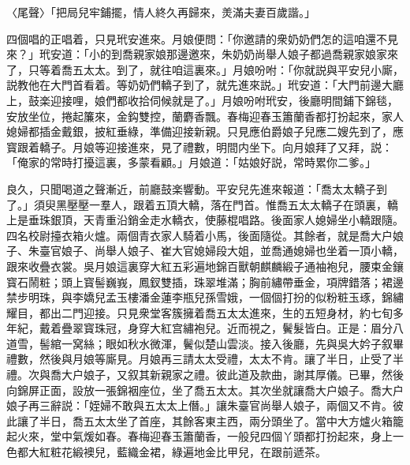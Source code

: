 〈尾聲〉「把局兒牢鋪擺，情人終久再歸來，羙滿夫妻百歲諧。」

四個唱的正唱着，只見玳安進來。月娘便問：「你邀請的衆奶奶們怎的這咱還不見來？」玳安道：「小的到喬親家娘那邊邀來，朱奶奶尚舉人娘子都過喬親家娘家來了，只等着喬五太太。到了，就往咱這裏來。」月娘吩咐：「你就説與平安兒小廝，説教他在大門首看着。等奶奶們轎子到了，就先進來説。」玳安道：「大門前邊大廳上，鼓楽迎接哩，娘們都收拾伺候就是了。」月娘吩咐玳安，後廳明間鋪下錦毯，安放坐位，捲起簾來，金鈎雙控，蘭麝香飄。春梅迎春玉簫蘭香都打扮起來，家人媳婦都插金戴銀，披紅垂綠，準備迎接新親。只見應伯爵娘子兒應二嫂先到了，應寳跟着轎子。月娘等迎接進來，見了禮數，明間内坐下。向月娘拜了又拜，説：「俺家的常時打擾這裏，多蒙看顧。」月娘道：「姑娘好説，常時累你二爹。」

良久，只聞喝道之聲漸近，前廳鼓楽響動。平安兒先進來報道：「喬太太轎子到了。」須臾黑壓壓一羣人，跟着五頂大轎，落在門首。惟喬五太太轎子在頭裏，轎上是垂珠銀頂，天青重沿銷金走水轎衣，使藤棍唱路。後面家人媳婦坐小轎跟隨。四名校尉擡衣箱火爐。兩個青衣家人騎着小馬，後面隨從。其餘者，就是喬大户娘子、朱臺官娘子、尚舉人娘子、崔大官媳婦段大姐，並喬通媳婦也坐着一頂小轎，跟來收疊衣裳。吳月娘這裏穿大紅五彩遍地錦百獸朝麒麟緞子通袖袍兒，腰束金鑲寳石鬧粧；頭上寳髻巍峩，鳳釵雙插，珠翠堆滿；胸前繡帶垂金，項牌錯落；裙邊禁步明珠，與李嬌兒孟玉樓潘金蓮李瓶兒孫雪娥，一個個打扮的似粉粧玉琢，錦繡耀目，都出二門迎接。只見衆堂客簇擁着喬五太太進來，生的五短身材，約七旬多年紀，戴着疊翠寳珠冠，身穿大紅宫繡袍兒。近而視之，鬢髮皆白。正是：眉分八道雪，髻綰一窝絲；眼如秋水微渾，鬢似楚山雲淡。接入後廳，先與吳大妗子叙畢禮數，然後與月娘等廝見。月娘再三請太太受禮，太太不肯。讓了半日，止受了半禮。次與喬大户娘子，又叙其新親家之禮。彼此道及款曲，謝其厚儀。已畢，然後向錦屏正面，設放一張錦裀座位，坐了喬五太太。其次坐就讓喬大户娘子。喬大户娘子再三辭説：「姪婦不敢與五太太上僭。」讓朱臺官尚舉人娘子，兩個又不肯。彼此讓了半日，喬五太太坐了首座，其餘客東主西，兩分頭坐了。當中大方爐火箱籠起火來，堂中氣煖如春。春梅迎春玉簫蘭香，一般兒四個丫頭都打扮起來，身上一色都大紅粧花緞襖兒，藍織金裙，綠遍地金比甲兒，在跟前遞茶。

